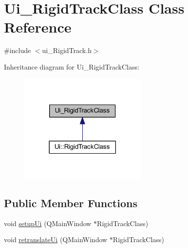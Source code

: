 \hypertarget{class_ui___rigid_track_class}{}\section{Ui\+\_\+\+Rigid\+Track\+Class Class Reference}
\label{class_ui___rigid_track_class}


{\ttfamily \#include $<$ui\+\_\+\+Rigid\+Track.\+h$>$}



Inheritance diagram for Ui\+\_\+\+Rigid\+Track\+Class\+:\nopagebreak
\begin{figure}[H]
\begin{center}
\leavevmode
\includegraphics[width=182pt]{class_ui___rigid_track_class__inherit__graph}
\end{center}
\end{figure}
\subsection*{Public Member Functions}
\begin{DoxyCompactItemize}
\item 
void \hyperlink{class_ui___rigid_track_class_a7f78fefc15716049b873bef4d3450e38}{setup\+Ui} (Q\+Main\+Window $\ast$Rigid\+Track\+Class)
\item 
void \hyperlink{class_ui___rigid_track_class_a7c96951c4e173848e7695d6bd7883af6}{retranslate\+Ui} (Q\+Main\+Window $\ast$Rigid\+Track\+Class)
\end{DoxyCompactItemize}
